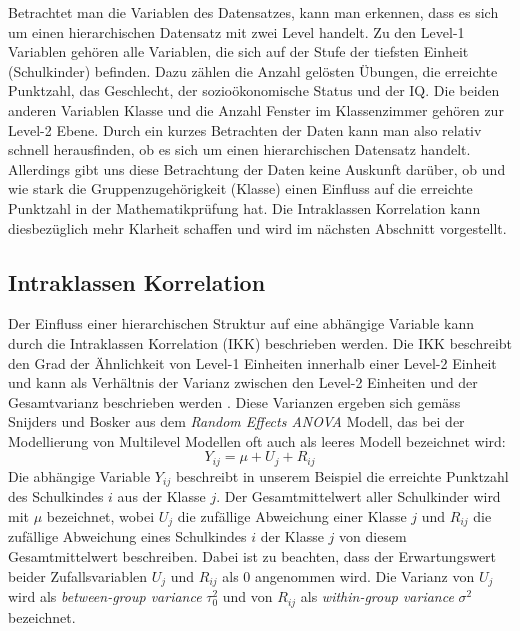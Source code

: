 \documentclass[12pt]{article}\usepackage[]{graphicx}\usepackage[]{color}
\begin{document}
Betrachtet man die Variablen des Datensatzes, kann man erkennen, dass es sich um einen hierarchischen Datensatz mit zwei Level handelt. Zu den Level-1 Variablen gehören alle Variablen, die sich auf der Stufe der tiefsten Einheit (Schulkinder) befinden. Dazu zählen die Anzahl gelösten Übungen, die erreichte Punktzahl, das Geschlecht, der sozioökonomische Status und der IQ. Die beiden anderen Variablen Klasse und die Anzahl Fenster im Klassenzimmer gehören zur Level-2 Ebene. Durch ein kurzes Betrachten der Daten kann man also relativ schnell herausfinden, ob es sich um einen hierarchischen Datensatz handelt. Allerdings gibt uns diese Betrachtung der Daten keine Auskunft darüber, ob und wie stark die Gruppenzugehörigkeit (Klasse) einen Einfluss auf die erreichte Punktzahl in der Mathematikprüfung hat. Die Intraklassen Korrelation kann diesbezüglich mehr Klarheit schaffen und wird im nächsten Abschnitt vorgestellt.


\subsection{Intraklassen Korrelation} \label{section:icc}
Der Einfluss einer hierarchischen Struktur auf eine abhängige Variable kann durch die Intraklassen Korrelation (IKK) beschrieben werden. Die IKK beschreibt den Grad der Ähnlichkeit von Level-1 Einheiten innerhalb einer Level-2 Einheit und kann als Verhältnis der Varianz zwischen den Level-2 Einheiten und der Gesamtvarianz beschrieben werden \citep{FieldAndy2013DsuR, SnijdersTomA.B2012Ma:a, twisk_2006}. Diese Varianzen ergeben sich gemäss Snijders und Bosker \citeyearpar{SnijdersTomA.B2012Ma:a} aus dem \textit{Random Effects ANOVA} Modell, das bei der Modellierung von Multilevel Modellen oft auch als leeres Modell bezeichnet wird:
\begin{equation} \label{eq:empty_model}
Y_{ij} = \mu + U_{j} + R_{ij}
\end{equation}
Die abhängige Variable $Y_{ij}$ beschreibt in unserem Beispiel die erreichte Punktzahl des Schulkindes $i$ aus der Klasse $j$. Der Gesamtmittelwert aller Schulkinder wird mit $\mu$ bezeichnet, wobei $U_{j}$ die zufällige Abweichung einer Klasse $j$ und $R_{ij}$ die zufällige Abweichung eines Schulkindes $i$ der Klasse $j$ von diesem Gesamtmittelwert beschreiben. Dabei ist zu beachten, dass der Erwartungswert beider Zufallsvariablen $U_{j}$ und $R_{ij}$ als 0 angenommen wird. Die Varianz von $U_{j}$ wird als \textit{between-group variance} $\tau_{0}^2$ und von $R_{ij}$ als \textit{within-group variance} $\sigma^2$ bezeichnet.
\end{document}
